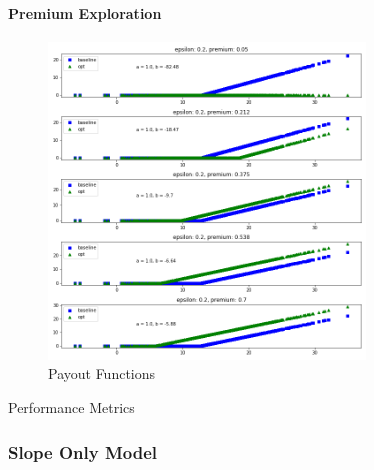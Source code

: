 \documentclass[11pt]{article}
\begin{document}
            \paragraph*{Premium Exploration}
                \begin{figure}[H]
                    \centering
                    \caption{Payout Functions}
                    \includegraphics[width=0.75\textwidth]{../../output/figures/CVaR/premium_exploration_intercept.png}
                \end{figure}

                \begin{table}[H]
                    \centering
                    \caption{Performance Metrics}
                    
                \end{table}

                \FloatBarrier

        \subsubsection*{Slope Only Model}
\end{document}
